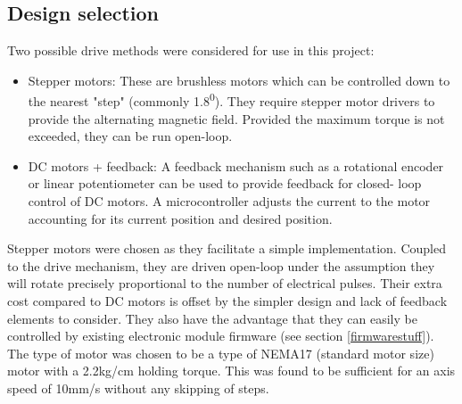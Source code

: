 



\subsection{Design selection}
Two possible drive methods were considered for use in this project:
\begin{itemize}
	\item	Stepper motors: These are brushless motors which can be controlled down to the nearest "step" (commonly 1.8\textsuperscript{0}). They require
			stepper motor drivers to provide the alternating magnetic field. Provided the maximum torque is not exceeded, they can be run open-loop.
	\item	DC motors + feedback: A feedback mechanism such as a rotational encoder or linear potentiometer can be used to provide feedback for closed-
			loop control of DC motors. A microcontroller adjusts the current to the motor accounting for its current position and desired position.
\end{itemize}
Stepper motors were chosen as they facilitate a simple implementation.
Coupled to the drive mechanism, they are driven open-loop under the
assumption they will rotate precisely proportional to the number of 
electrical pulses. Their extra cost compared to DC motors is offset
by the simpler design and lack of feedback elements to consider. They
also have the advantage that they can easily be controlled by existing
electronic module firmware (see section \ref{firmwarestuff}). The type
of motor was chosen to be a type of NEMA17 (standard motor size) motor
with a 2.2kg/cm holding torque. This was found to be sufficient for an 
axis speed of 10mm/s without any skipping of steps.



